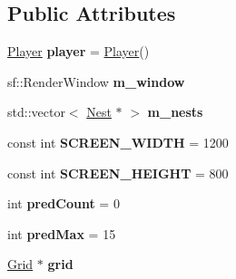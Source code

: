 \subsection*{Public Attributes}
\begin{DoxyCompactItemize}
\item 
\mbox{\label{class_game_a6e48721b0532833b99fd5615a3628792}} 
\mbox{\hyperlink{class_player}{Player}} {\bfseries player} = \mbox{\hyperlink{class_player}{Player}}()
\item 
\mbox{\label{class_game_a22a61b5ea27c609be8cf2724c33d7ae5}} 
sf\+::\+Render\+Window {\bfseries m\+\_\+window}
\item 
\mbox{\label{class_game_a0bf2c4ab713882ac7ea85043e364edfd}} 
std\+::vector$<$ \mbox{\hyperlink{class_nest}{Nest}} $\ast$ $>$ {\bfseries m\+\_\+nests}
\item 
\mbox{\label{class_game_a8aee472d1972eced3c805bcc6f9e439b}} 
const int {\bfseries S\+C\+R\+E\+E\+N\+\_\+\+W\+I\+D\+TH} = 1200
\item 
\mbox{\label{class_game_ad2702f723f5e55929cb6047c79ebdf2e}} 
const int {\bfseries S\+C\+R\+E\+E\+N\+\_\+\+H\+E\+I\+G\+HT} = 800
\item 
\mbox{\label{class_game_a31064a4d2c16c47b345ccdc3ee50014f}} 
int {\bfseries pred\+Count} = 0
\item 
\mbox{\label{class_game_aaaa8c73a0bc4154802451a2effe484ee}} 
int {\bfseries pred\+Max} = 15
\item 
\mbox{\label{class_game_ac39fcaa59b270bbc551ca841a0466170}} 
\mbox{\hyperlink{class_grid}{Grid}} $\ast$ {\bfseries grid}
\end{DoxyCompactItemize}
